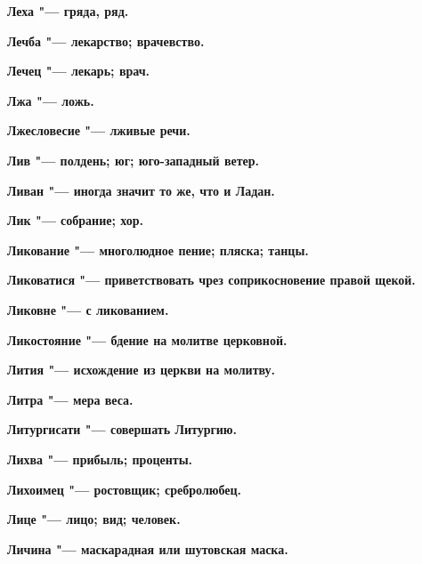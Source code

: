 \bfseries Леха \normalfont{} "--- гряда, ряд. 




\bfseries Лечба \normalfont{} "--- лекарство; врачевство. 




\bfseries Лечец \normalfont{} "--- лекарь; врач. 




\bfseries Лжа \normalfont{} "--- ложь. 




\bfseries Лжесловесие \normalfont{} "--- лживые речи. 




\bfseries Лив \normalfont{} "--- полдень; юг; юго-западный ветер. 




\bfseries Ливан \normalfont{} "--- иногда значит то же, что и Ладан. 




\bfseries Лик \normalfont{} "--- собрание; хор. 




\bfseries Ликование \normalfont{} "--- многолюдное пение; пляска; танцы. 




\bfseries Ликоватися \normalfont{} "--- приветствовать чрез соприкосновение правой щекой. 




\bfseries Ликовне \normalfont{} "--- с ликованием. 




\bfseries Ликостояние \normalfont{} "--- бдение на молитве церковной. 




\bfseries Лития \normalfont{} "--- исхождение из церкви на молитву. 




\bfseries Литра \normalfont{} "--- мера веса. 




\bfseries Литургисати \normalfont{} "--- совершать Литургию. 




\bfseries Лихва \normalfont{} "--- прибыль; проценты. 




\bfseries Лихоимец \normalfont{} "--- ростовщик; сребролюбец. 




\bfseries Лице \normalfont{} "--- лицо; вид; человек. 




\bfseries Личина \normalfont{} "--- маскарадная или шутовская маска. 




